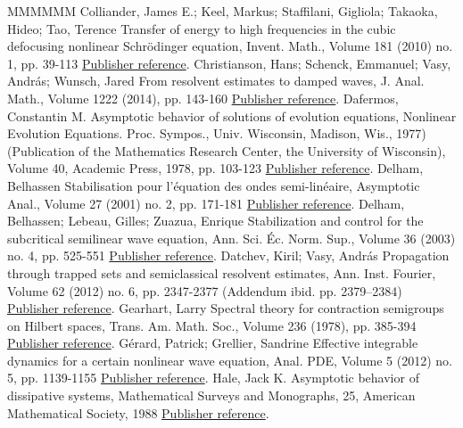 \begin{thebibliography}{MMMMMM}
 Colliander, James E.; Keel, Markus; Staffilani, Gigliola; Takaoka, Hideo; Tao, Terence Transfer of energy to high frequencies in the cubic defocusing nonlinear Schrödinger equation, Invent. Math., Volume 181 (2010) no. 1, pp. 39-113 \href{https://ahl.centre-mersenne.org/item/AHL_2020__3__1241_0/#Colliander}{Publisher reference}.
 Christianson, Hans; Schenck, Emmanuel; Vasy, András; Wunsch, Jared From resolvent estimates to damped waves, J. Anal. Math., Volume 1222 (2014), pp. 143-160 \href{https://ahl.centre-mersenne.org/item/AHL_2020__3__1241_0/#CSVW}{Publisher reference}.
 Dafermos, Constantin M. Asymptotic behavior of solutions of evolution equations, Nonlinear Evolution Equations. Proc. Sympos., Univ. Wisconsin, Madison, Wis., 1977) (Publication of the Mathematics Research Center, the University of Wisconsin), Volume 40, Academic Press, 1978, pp. 103-123 \href{https://ahl.centre-mersenne.org/item/AHL_2020__3__1241_0/#Dafermos}{Publisher reference}.
 Delham, Belhassen Stabilisation pour l’équation des ondes semi-linéaire, Asymptotic Anal., Volume 27 (2001) no. 2, pp. 171-181 \href{https://ahl.centre-mersenne.org/item/AHL_2020__3__1241_0/#Dehman}{Publisher reference}.
 Delham, Belhassen; Lebeau, Gilles; Zuazua, Enrique Stabilization and control for the subcritical semilinear wave equation, Ann. Sci. Éc. Norm. Sup., Volume 36 (2003) no. 4, pp. 525-551 \href{https://ahl.centre-mersenne.org/item/AHL_2020__3__1241_0/#DLZ}{Publisher reference}.
 Datchev, Kiril; Vasy, András Propagation through trapped sets and semiclassical resolvent estimates, Ann. Inst. Fourier, Volume 62 (2012) no. 6, pp. 2347-2377 (Addendum ibid. pp. 2379–2384) \href{https://ahl.centre-mersenne.org/item/AHL_2020__3__1241_0/#Vasy}{Publisher reference}.
 Gearhart, Larry Spectral theory for contraction semigroups on Hilbert spaces, Trans. Am. Math. Soc., Volume 236 (1978), pp. 385-394 \href{https://ahl.centre-mersenne.org/item/AHL_2020__3__1241_0/#Ge}{Publisher reference}.
 Gérard, Patrick; Grellier, Sandrine Effective integrable dynamics for a certain nonlinear wave equation, Anal. PDE, Volume 5 (2012) no. 5, pp. 1139-1155 \href{https://ahl.centre-mersenne.org/item/AHL_2020__3__1241_0/#Gerard-Grellier}{Publisher reference}.
 Hale, Jack K. Asymptotic behavior of dissipative systems, Mathematical Surveys and Monographs, 25, American Mathematical Society, 1988 \href{https://ahl.centre-mersenne.org/item/AHL_2020__3__1241_0/#Hale-book}{Publisher reference}.

\end{thebibliography}
